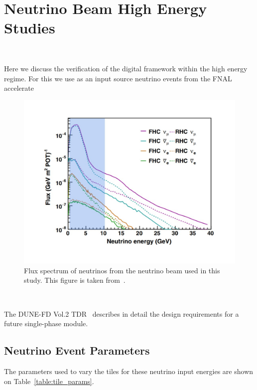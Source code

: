 \section{Neutrino Beam High Energy Studies}~\label{sec:neutrino_studies}

Here we discuss the verification of the digital framework within the high energy regime.
For this we use as an input source neutrino events from the FNAL accelerate

\begin{figure}[]
\centering
\includegraphics[width=\textwidth]{images/dune_flux_energy_range.pdf}
\caption{Flux spectrum of neutrinos from the neutrino beam used in this study. This figure is taken from~\cite{electron_flux_image_2020}.}
\end{figure}~\label{fig:neutrino_flux}


The DUNE-FD Vol.2 TDR~\citep{DUNE_FD_TDRv2_2020} describes in detail the design requirements for a future single-phase module.





\subsection{Neutrino Event Parameters}

The parameters used to vary the tiles for these neutrino input energies are shown on Table~\ref{table:tile_params}.



